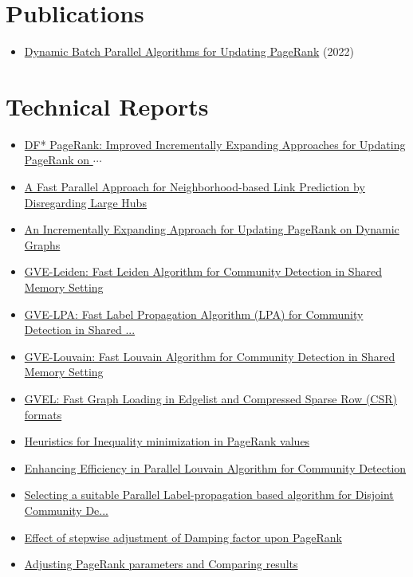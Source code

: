\section*{Publications}

\begin{itemize}[noitemsep, leftmargin=*]
  \item \href{https://ieeexplore.ieee.org/abstract/document/9835216/}{Dynamic Batch Parallel Algorithms for Updating PageRank} (2022)
\end{itemize}




\section*{Technical Reports}

\begin{itemize}[noitemsep, leftmargin=*]
  \item \href{https://arxiv.org/abs/2401.15870}{DF* PageRank: Improved Incrementally Expanding Approaches for Updating PageRank on $\cdots$}
  \item \href{https://arxiv.org/abs/2401.11415}{A Fast Parallel Approach for Neighborhood-based Link Prediction by Disregarding Large Hubs}
  \item \href{https://arxiv.org/abs/2401.03256}{An Incrementally Expanding Approach for Updating PageRank on Dynamic Graphs}
  \item \href{https://arxiv.org/abs/2312.13936}{GVE-Leiden: Fast Leiden Algorithm for Community Detection in Shared Memory Setting}
  \item \href{https://arxiv.org/abs/2312.08140}{GVE-LPA: Fast Label Propagation Algorithm (LPA) for Community Detection in Shared ...}
  \item \href{https://arxiv.org/abs/2312.04876}{GVE-Louvain: Fast Louvain Algorithm for Community Detection in Shared Memory Setting}
  \item \href{https://arxiv.org/abs/2311.14650}{GVEL: Fast Graph Loading in Edgelist and Compressed Sparse Row (CSR) formats}
  \item \href{https://arxiv.org/abs/2310.18537}{Heuristics for Inequality minimization in PageRank values}
  \item \href{https://arxiv.org/abs/2301.12390}{Enhancing Efficiency in Parallel Louvain Algorithm for Community Detection}
  \item \href{https://arxiv.org/abs/2301.09125}{Selecting a suitable Parallel Label-propagation based algorithm for Disjoint Community De...}
  \item \href{https://arxiv.org/abs/2108.04150}{Effect of stepwise adjustment of Damping factor upon PageRank}
  \item \href{https://arxiv.org/abs/2108.02997}{Adjusting PageRank parameters and Comparing results}
\end{itemize}
